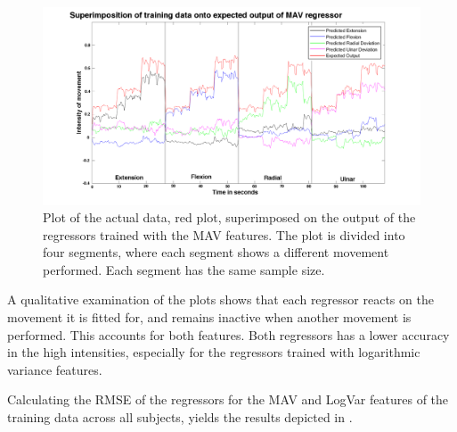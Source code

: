 \begin{figure}[H]
	\includegraphics[width=1\textwidth]{figures/results/NewSuperPositionTestDataMAV}  %
	\caption{Plot of the actual data, red plot, superimposed on the output of the regressors trained with the MAV features. The plot is divided into four segments, where each segment shows a different movement performed. Each segment has the same sample size.}
	\label{fig:SuperPositionTestDataMAV}  %
\end{figure}


A qualitative examination of the plots shows that each regressor reacts on the movement it is fitted for, and remains inactive when another movement is performed. This accounts for both features. Both regressors has a lower accuracy in the high intensities, especially for the regressors trained with logarithmic variance features. 
  


Calculating the RMSE of the regressors for the MAV and LogVar features of the training data across all subjects, yields the results depicted in . 

